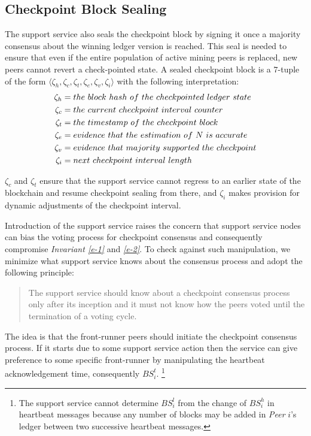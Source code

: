 \subsection{Checkpoint Block Sealing}
The support service also seals the checkpoint block by signing it once a majority consensus about the winning ledger version is reached. This seal is needed to ensure that even if the entire population of active mining peers is replaced, new peers cannot revert a check-pointed state. A sealed checkpoint block is a $7$-tuple of the form $\langle \zeta_h, \zeta_c, \zeta_t, \zeta_e, \zeta_v, \zeta_i \rangle$ with the following interpretation:
\begin{equation*}
\begin{split}
	\zeta_h & = the\ block\ hash\ of\ the\ check\-pointed\ ledger\ state \\
	\zeta_c & = the\ current\ checkpoint\ interval\ counter \\
	\zeta_t & = the\ timestamp\ of\ the\ checkpoint\ block \\
	\zeta_e & = evidence\ that\ the\ estimation\ of\ N\ is\ accurate \\
	\zeta_v & = evidence\ that\ majority\ supported\ the\ checkpoint \\
	\zeta_i & = next\ checkpoint\ interval\ length
\end{split}
\end{equation*}

$\zeta_c$ and $\zeta_t$ ensure that the support service cannot regress to an earlier state of the blockchain and resume checkpoint sealing from there, and $\zeta_i$ makes provision for dynamic adjustments of the checkpoint interval.

Introduction of the support service raises the concern that support service nodes can bias the voting process for checkpoint consensus and consequently compromise \textit{Invariant \ref{e-1}} and \textit{\ref{e-2}}. To check against such manipulation, we minimize what support service knows about the consensus process and adopt the following principle:

\begin{quote}
The support service should know about a checkpoint consensus process only after its inception and it must not know how the peers voted until the termination of a voting cycle.         
\end{quote}

The idea is that the front-runner peers should initiate the checkpoint consensus process. If it starts due to some support service action then the service can give preference to some specific front-runner by manipulating the heartbeat acknowledgement time, consequently $BS_i^t$. \footnote{The support service cannot determine $BS_i^l$ from the change of $BS_i^h$ in heartbeat messages because any number of blocks may be added in \textit{Peer} $i$'s ledger between two successive heartbeat messages.}

